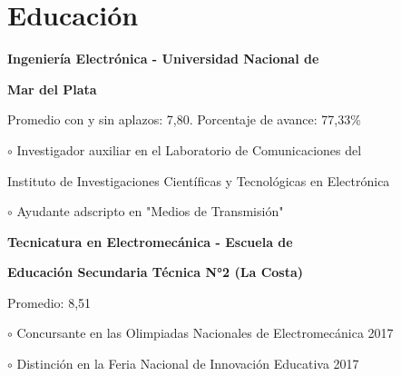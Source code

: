 \begin{adjustbox}{valign=t}
\begin{minipage}{0.60\textwidth} %
\section*{Educación}
\begin{description}
\raggedright
\item[ \textcolor{ColorOne}{2018-2023}] 
	\textbf{Ingeniería Electrónica - Universidad Nacional de  } \Myskip
    \item \textbf{Mar del Plata}
    \item Promedio con y sin aplazos: 7,80. Porcentaje de avance: 77,33\%
    \item \textcolor{ColorOne}{$\circ$} Investigador auxiliar en el Laboratorio de Comunicaciones del
    \item \hspace{1}Instituto de Investigaciones Científicas y Tecnológicas en Electrónica 
    \item \textcolor{ColorOne}{$\circ$} Ayudante adscripto en "Medios de Transmisión" \MySkip
 
\item[ \textcolor{ColorOne}{2011-2017}] 
	\textbf{Tecnicatura en Electromecánica - Escuela de } \Myskip
    \item \textbf{Educación Secundaria Técnica N°2 (La Costa)}
    \item Promedio: 8,51
    \item \textcolor{ColorOne}{$\circ$} Concursante en las Olimpiadas Nacionales de Electromecánica 2017
    \item \textcolor{ColorOne}{$\circ$} Distinción en la Feria Nacional de Innovación Educativa 2017


\end{description}
\end{minipage}
\end{adjustbox}
